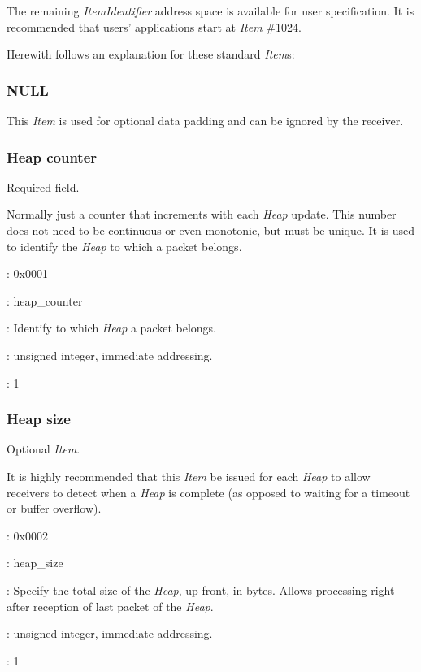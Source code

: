 \documentclass[11pt,english,twoside]{article}
\begin{document}
The remaining \emph{ItemIdentifier} address space is available for user specification. It is recommended that users' applications start at
\emph{Item} \#1024.

Herewith follows an explanation for these standard \emph{Item}s:


\subsubsection{NULL}

This \emph{Item} is used for optional data padding and can be ignored by the receiver.


\subsubsection{Heap counter}

Required field.

Normally just a counter that increments with each \emph{Heap} update. This number does not need to be continuous or even monotonic, but must be
unique. It is used to identify the \emph{Heap} to which a packet belongs.
\begin{description}
\setlength{\itemindent}{0.5cm}
\setlength{\itemsep}{0ex plus0.2ex}
\item[Numerical Identifier]: 0x0001
\item[Name]: heap\_counter
\item[Description]: Identify to which \emph{Heap} a packet belongs.
\item[Type]: unsigned integer, immediate addressing.
\item[Shape]: 1
\end{description}


\subsubsection{Heap size}

Optional \emph{Item}.

It is highly recommended that this \emph{Item} be issued for each \emph{Heap} to allow receivers to detect when a \emph{Heap} is complete (as opposed
to waiting for a timeout or buffer overflow).
\begin{description}
\setlength{\itemindent}{0.5cm}
\setlength{\itemsep}{0ex plus0.2ex}
\item[Numerical Identifier]: 0x0002
\item[Name]: heap\_size
\item[Description]: Specify the total size of the \emph{Heap}, up-front, in bytes. Allows processing right after reception of last packet of the
\emph{Heap}.
\item[Type]: unsigned integer, immediate addressing.
\item[Shape]: 1
\end{description}
\end{document}
